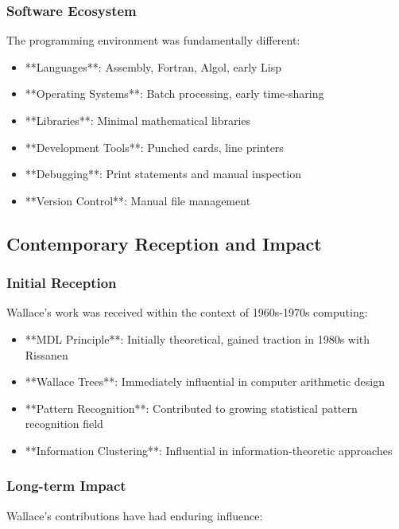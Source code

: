 \subsubsection{Software Ecosystem}

The programming environment was fundamentally different:

\begin{itemize}
    \item **Languages**: Assembly, Fortran, Algol, early Lisp
    \item **Operating Systems**: Batch processing, early time-sharing
    \item **Libraries**: Minimal mathematical libraries
    \item **Development Tools**: Punched cards, line printers
    \item **Debugging**: Print statements and manual inspection
    \item **Version Control**: Manual file management
\end{itemize}

\subsection{Contemporary Reception and Impact}

\subsubsection{Initial Reception}

Wallace's work was received within the context of 1960s-1970s computing:

\begin{itemize}
    \item **MDL Principle**: Initially theoretical, gained traction in 1980s with Rissanen
    \item **Wallace Trees**: Immediately influential in computer arithmetic design
    \item **Pattern Recognition**: Contributed to growing statistical pattern recognition field
    \item **Information Clustering**: Influential in information-theoretic approaches
\end{itemize}

\subsubsection{Long-term Impact}

Wallace's contributions have had enduring influence:

